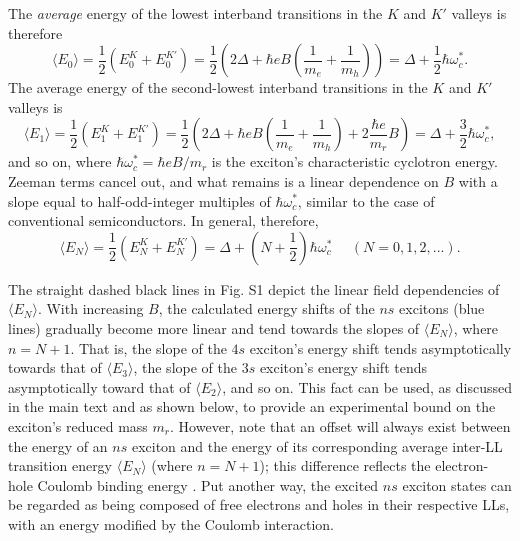 \documentclass[aps,prl,twocolumn]{revtex4-1}
\begin{document}
The \textit{average} energy of the lowest interband transitions in the $K$ and $K'$ valleys is therefore
\begin{equation}
\langle E_0 \rangle = \frac{1}{2}(E_0^{K} + E_0^{K'}) = \frac{1}{2} \left( 2\Delta + \hbar e B \left( \frac{1}{m_e} + \frac{1}{m_h}\right) \right) = \Delta + \frac{1}{2}\hbar \omega_c^*.
\end{equation}
The average energy of the second-lowest interband transitions in the $K$ and $K'$ valleys is
\begin{equation}
\langle E_1 \rangle = \frac{1}{2}(E_1^{K} + E_1^{K'}) = \frac{1}{2} \left( 2\Delta + \hbar e B \left(\frac{1}{m_e} + \frac{1}{m_h}\right) + 2\frac{\hbar e}{m_r}B \right)  = \Delta + \frac{3}{2}\hbar \omega_c^*,
\end{equation}
and so on, where $\hbar \omega_c^* = \hbar e B/m_r$ is the exciton's characteristic cyclotron energy. Zeeman terms cancel out, and what remains is a linear dependence on $B$ with a slope equal to half-odd-integer multiples of $\hbar \omega_c^*$, similar to the case of conventional semiconductors.  In general, therefore,
\begin{equation}
\langle E_N \rangle = \frac{1}{2}(E_N^{K} + E_N^{K'}) = \Delta + \left(N+\frac{1}{2}\right)\hbar \omega_c^* ~~~~~~ (N=0, 1, 2,...).
\end{equation}

The straight dashed black lines in Fig. S1 depict the linear field dependencies of $\langle E_N \rangle$. With increasing $B$, the calculated energy shifts of the $ns$ excitons (blue lines) gradually become more linear and tend towards the slopes of $\langle E_N \rangle$, where $n= N+1$.  That is, the slope of the $4s$ exciton's energy shift tends asymptotically towards that of $\langle E_3 \rangle$, the slope of the $3s$ exciton's energy shift tends asymptotically toward that of $\langle E_2 \rangle$, and so on. This fact can be used, as discussed in the main text and as shown below, to provide an experimental bound on the exciton's reduced mass $m_r$. However, note that an offset will always exist between the energy of an $ns$ exciton and the energy of its corresponding average inter-LL transition energy $\langle E_N \rangle$ (where $n= N+1$); this difference reflects the electron-hole Coulomb binding energy \cite{Akimoto-1967-181, MacDonald-1986-8336, Edelstein-1989-7697, Miura-2008}.  Put another way, the excited $ns$ exciton states can be regarded as being composed of free electrons and holes in their respective LLs, with an energy modified by the Coulomb interaction.  
\end{document}
